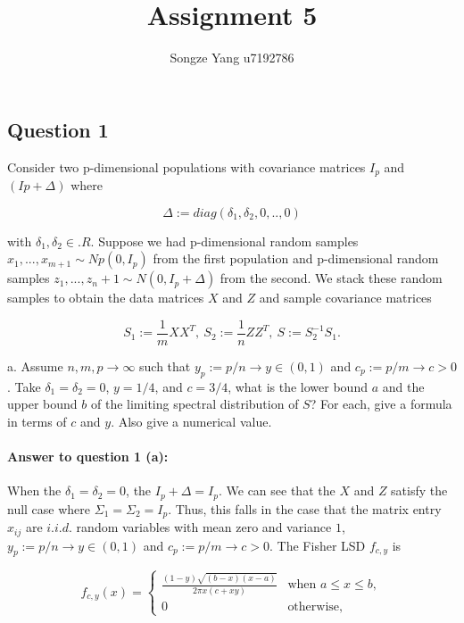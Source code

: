 \documentclass[
]{article}
\title{Assignment 5}
\author{Songze Yang u7192786}
\date{}
\begin{document}
\maketitle

\subsection{Question 1}\label{question-1}

Consider two p-dimensional populations with covariance matrices \(I_p\)
and \((Ip + \Delta)\) where

\[
\Delta := diag(\delta_1, \delta_2, 0,.., 0)
\]

with \(\delta_1, \delta_2 \in. R\). Suppose we had p-dimensional random
samples \(x_1, . . . , x_{m+1} \sim Np(0, I_p)\) from the first
population and p-dimensional random samples
\(z_1, ..., z_n+1 \sim N(0, I_p + \Delta)\) from the second. We stack
these random samples to obtain the data matrices \(X\) and \(Z\) and
sample covariance matrices

\[
S_1 := \frac{1}{m}XX^T, \ 
S_2 := \frac{1}{n}ZZ^T, \ 
S := S_2^{-1}S_1.
\]

a. Assume \(n, m, p \rightarrow \infty\) such that
\(y_p := p/n \rightarrow y \in (0, 1)\) and
\(c_p := p/m \rightarrow c > 0\). Take \(\delta_1 = \delta_2 = 0\),
\(y = 1/4\), and \(c = 3/4\), what is the lower bound \(a\) and the
upper bound \(b\) of the limiting spectral distribution of \(S\)? For
each, give a formula in terms of \(c\) and \(y\). Also give a numerical
value.

\paragraph{\texorpdfstring{\textbf{Answer to question 1
(a)}:}{Answer to question 1 (a):}}\label{answer-to-question-1-a}

When the \(\delta_1 = \delta_2 = 0\), the \(I_p + \Delta = I_p\). We can
see that the \(X\) and \(Z\) satisfy the null case where
\(\Sigma_1 = \Sigma_2 = I_p\). Thus, this falls in the case that the
matrix entry \(x_{ij}\) are \(i.i.d.\) random variables with mean zero
and variance \(1\), \(y_p := p/n \rightarrow y \in (0, 1)\) and
\(c_p := p/m \rightarrow c > 0\). The Fisher LSD \(f_{c, y}\) is

\[
f_{c,y}(x) = \begin{cases} \frac{(1-y) \sqrt{(b-x)(x-a)}}{2\pi x (c+xy)} & \text{when } a \leq x \leq b, \\0 & \text{otherwise},\end{cases}
\]
\end{document}
